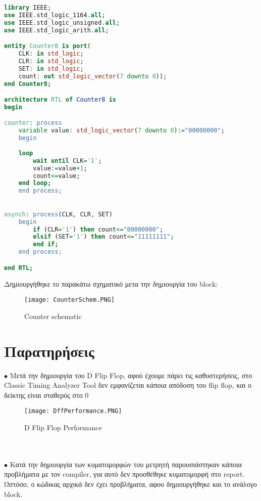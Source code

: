 \documentclass{article}
\begin{document}
\begin{otherlanguage}{english}
\begin{lstlisting}[language=VHDL, caption= VHDL Counter ]
library IEEE;
use IEEE.std_logic_1164.all;
use IEEE.std_logic_unsigned.all;
use IEEE.std_logic_arith.all;

entity Counter8 is port(
	CLK: in std_logic;
	CLR: in std_logic;
	SET: in std_logic;
	count: out std_logic_vector(7 downto 0));
end Counter8;

architecture RTL of Counter8 is
begin

counter: process
	variable value: std_logic_vector(7 downto 0):="00000000";
	begin
	
	loop
		wait until CLK='1';
		value:=value+1;
		count<=value;
	end loop;
	end process;
	

asynch: process(CLK, CLR, SET)
	begin
		if (CLR='1') then count<="00000000";
		elsif (SET='1') then count<="11111111";
		end if;
	end process;

end RTL;
\end{lstlisting}
\end{otherlanguage}


\clearpage

Δημιουργήθηκε το παρακάτω σχηματικό μετα την δημιουργία του \foreignlanguage{english}{block}:

\begin{figure}[h!]
  \caption{\foreignlanguage{english}{Counter schematic}}
\texttt{[image: CounterSchem.PNG]} 
\end{figure}







\clearpage


\section{Παρατηρήσεις}

$\bullet$ Μετά την δημιουργία του \foreignlanguage{english}{D Flip Flop}, αφού έχουμε πάρει τις καθυστερήσεις, στο \foreignlanguage{english}{Classic Timing Analyzer Tool} δεν εμφανίζεται κάποια απόδοση του \foreignlanguage{english}{flip flop}, και ο δείκτης είναι σταθερός στο $0$

\begin{figure}[h!]
  \caption{\foreignlanguage{english}{D Flip Flop Performance}}
\texttt{[image: DffPerformance.PNG]}
\end{figure} \\ \\ 

$\bullet$ Κατά την δημιουργία των κυματομορφών του μετρητή παρουσιάστηκαν κάποια προβλήματα με τον \foreignlanguage{english}{compiler}, για αυτό δεν προσθέθηκε κυματομορφή στο \foreignlanguage{english}{report}. Ωστόσο, ο κώδικας αρχικά δεν έχει προβλήματα, αφου δημιουργήθηκε και το ανάλογο \foreignlanguage{english}{block}.
\end{document}

